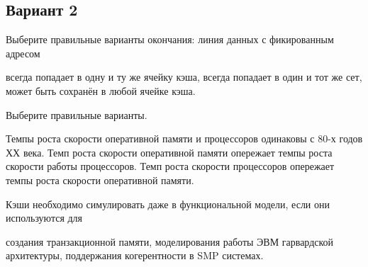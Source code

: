 \subsection*{Вариант 2}
\begin{questions}

\question[3] Выберите правильные варианты окончания: линия данных с фикированным адресом
\begin{choices}
    \choice всегда попадает в одну и ту же ячейку кэша,
    \correctchoice всегда попадает в один и тот же сет,
    \choice может быть сохранён в любой ячейке кэша.
\end{choices}

\question[3] Выберите правильные варианты.
\begin{choices}
    \choice Темпы роста скорости оперативной памяти и процессоров одинаковы с 80-х годов ХХ века.
    \choice Темп роста скорости оперативной памяти опережает темпы роста скорости работы процессоров.
    \correctchoice Темп роста скорости процессоров опережает темпы роста скорости оперативной памяти. 
\end{choices}

\question[3] Кэши необходимо симулировать даже в функциональной модели, если они используются для
\begin{choices}
	\correctchoice создания транзакционной памяти,
	\choice моделирования работы ЭВМ гарвардской архитектуры,
	\choice поддержания когерентности в SMP системах.
\end{choices}





\end{questions}

